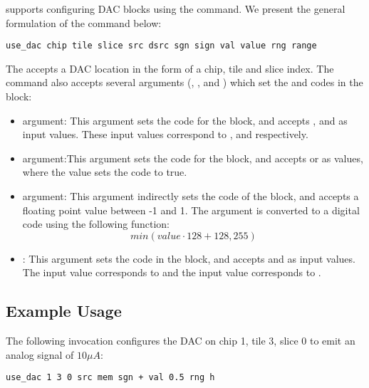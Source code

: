 \grendel supports configuring DAC blocks using the  command. We
present the general formulation of the  command below:

\begin{lstlisting}
use_dac chip tile slice src dsrc sgn sign val value rng range
\end{lstlisting}

The  accepts a DAC location in the form of a chip, tile and slice
index. The command also accepts several arguments (, ,
 and ) which set the \static and \dynamic codes in the block:
\begin{itemize}
\item{} argument: This argument sets the  \static code for
  the block, and accepts ,  and  as input values.
  These input values correspond to ,  and  respectively.

\item{} argument:This argument sets the  \static code for the
  block, and accepts \tx{+} or \tx{-} as values, where the \tx{-} value sets the
   code to true.

\item{} argument: This argument indirectly sets the 
  \dynamic code of the block, and accepts a floating point value between -1 and
  1. The  argument is converted to a digital code using the following function:
\[
  min(value \cdot 128 + 128,255)
\]
\item{}: This argument sets the  \static code in the block,
and accepts  and  as input values. The  input value
corresponds to  and the  input value corresponds to
.

\end{itemize}

\subsection{Example Usage}

The following invocation configures the DAC on chip 1, tile 3, slice 0 to emit
an analog signal of $10 \mu A$:

\begin{lstlisting}
use_dac 1 3 0 src mem sgn + val 0.5 rng h
\end{lstlisting}


